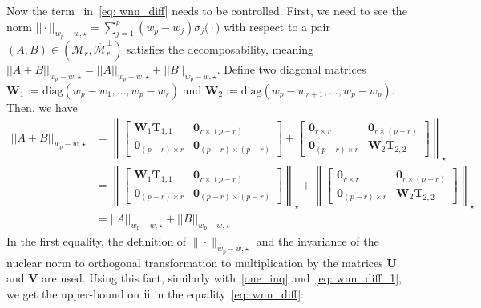 \documentclass[12pt]{article}
\newcommand{\RN}[1]{%
  \textup{\uppercase\expandafter{\romannumeral#1}}%
}
\begin{document}
Now the term~\RN{2} in~\eqref{eq: wnn_diff} needs to be controlled.
First, we need to see the norm $ ||\cdot||_{w_{p} - w, \star} = \sum^{p}_{j = 1} (w_{p}-w_{j}) \sigma_{j}\big(\cdot\big)$ with respect to a pair $(A,B)\in(\mathcal{M}_{r},\overline{\mathcal{M}}_{r}^{\perp})$ satisfies the decomposability, meaning $
||A+B||_{w_{p} - w, \star}=||A||_{w_{p} - w, \star}+||B||_{w_{p} - w, \star}$.
Define two diagonal matrices $\mathbf{W}_{1}:=\text{diag}(w_{p}-w_{1},\dots,w_{p}-w_{r})$ and $\mathbf{W}_{2}:=\text{diag}(w_{p}-w_{r+1},\dots,w_{p}-w_{p})$.
Then, we have 
\begin{align*}
    ||A+B||_{w_{p} - w, \star}
    &= \left\| \begin{bmatrix}
        \mathbf{W}_{1}\mathbf{T}_{1,1} & \mathbf{0}_{r\times (p-r)} \\
        \mathbf{0}_{(p-r) \times r} & \mathbf{0}_{(p-r) \times (p-r)} 
    \end{bmatrix} + 
    \begin{bmatrix}
        \mathbf{0}_{r \times r} & \mathbf{0}_{r\times (p-r)} \\
        \mathbf{0}_{(p-r) \times r} & \mathbf{W}_{2}\mathbf{T}_{2,2}
    \end{bmatrix}
    \right\|_{\star}\\
    &= \left\| \begin{bmatrix}
        \mathbf{W}_{1}\mathbf{T}_{1,1} & \mathbf{0}_{r\times (p-r)} \\
        \mathbf{0}_{(p-r) \times r} & \mathbf{0}_{(p-r) \times (p-r)} 
    \end{bmatrix}  \right\|_{\star} 
    + \left\|\begin{bmatrix}
        \mathbf{0}_{r \times r} & \mathbf{0}_{r\times (p-r)} \\
        \mathbf{0}_{(p-r) \times r} & \mathbf{W}_{2}\mathbf{T}_{2,2}
    \end{bmatrix}\right\|_{\star} \\
    &= ||A||_{w_{p} - w, \star}+||B||_{w_{p} - w, \star}.
\end{align*}
In the first equality, the definition of $\|\cdot\|_{w_{p} - w, \star}$ and the invariance of the nuclear norm to orthogonal transformation to multiplication by the matrices $\mathbf{U}$ and $\mathbf{V}$ are used. 
Using this fact, similarly with~\eqref{one_inq} and~\eqref{eq: wnn_diff_1}, we get the upper-bound on $\RN{2}$ in the equality~\eqref{eq: wnn_diff}: 
\end{document}
